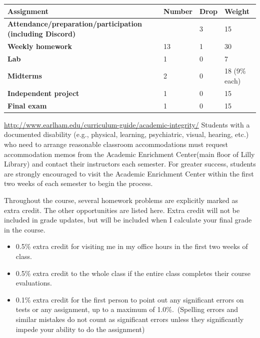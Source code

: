 \documentclass[12pt]{article}
\begin{document}
\begin{description}
\setlength{\arrayrulewidth}{1mm}
\setlength{\tabcolsep}{8pt}
{
\begin{table}[H]
\label{tab:my-table}
\begin{tabular}{llll}
\hline
\textbf{Assignment}                                              & \textbf{Number} & \textbf{Drop} & \textbf{Weight} \\ \hline
\textbf{Attendance/preparation/participation (including Discord)} &      & 3    & 15     \\
\textbf{Weekly homework }                                        & 13      & 1    & 30     \\
\textbf{Lab }                                        & 1      & 0    & 7     \\
\textbf{Midterms }                                    & 2      & 0    & 18 (9\% each)     \\
\textbf{Independent project }                                    & 1      & 0    & 15     \\
\textbf{Final exam }                                              & 1      & 0    & 15     \\ \hline
\end{tabular}
\end{table}
}

\newpage

\item[Academic Accommodations:] {\small \url{http://www.earlham.edu/curriculum-guide/academic-integrity/}}
 Students with a documented disability (e.g., physical, learning, psychiatric, visual, hearing, etc.) who need to arrange reasonable classroom accommodations must request accommodation memos from the Academic Enrichment Center(main floor of Lilly Library) and contact their instructors each semester. For greater success, students are strongly encouraged to visit the Academic Enrichment Center within the first two weeks of each semester to begin the process.
  
\item[Extra Credit:]
  Throughout the course, several homework problems are explicitly marked as extra credit. The other opportunities are listed here. Extra credit will not be included in grade updates, but will be included when I calculate your final grade in the course.
  \begin{itemize}
  \item 0.5\% extra credit for visiting me in my office hours in the first two weeks of class.
  \item 0.5\% extra credit to the whole class if the entire class completes their course evaluations.
  \item 0.1\% extra credit for the first person to point out any significant errors on tests or any assignment, up to a maximum of 1.0\%.\ (Spelling errors and similar mistakes do not count as significant errors unless they significantly impede your ability to do the assignment) 
    \end{itemize}


\end{description}
\end{document}
